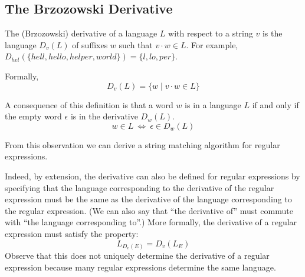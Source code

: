 \subsection{The Brzozowski Derivative}

The (Brzozowski) derivative of a language $L$ with respect to a string
$v$ is the language $D_v(L)$ of suffixes $w$ such that $v \cdot w \in L$.
For example, $D_{\mathit{hel}}(\{\mathit{hell}, \mathit{hello},\mathit{helper},\mathit{world}\}) = 
\{ \mathit{l}, \mathit{lo}, \mathit{per} \}$.

Formally,
\begin{equation*}
D_v(L) = \{ w \mid v \cdot w \in L \}
\end{equation*}

A consequence of this definition is that a word $w$ is in a language $L$ if and only if
the empty word $\epsilon$ is in the derivative $D_w(L)$.
\begin{equation*}
w \in L ~\Leftrightarrow~ \epsilon \in D_w(L)
\end{equation*}

From this observation we can derive a string matching algorithm for regular
expressions.

Indeed, by extension, the derivative can also be defined for regular
expressions by specifying that the language corresponding to the derivative of
the regular expression must be the same as the derivative of the language
corresponding to the regular expression.  (We can also say that ``the
derivative of'' must commute with ``the language corresponding to''.) More
formally, the derivative of a regular expression must satisfy the property:
\begin{equation}\label{eq:deriv_re:spec}
L_{D_v(E)} = D_v(L_E)
\end{equation}
Observe that this does not uniquely determine the derivative of a regular
expression because many regular expressions determine the same language.

